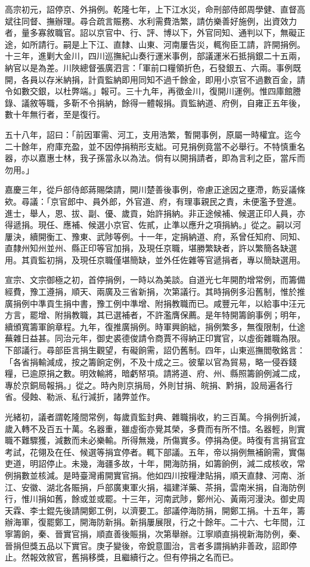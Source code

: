 \begin{pinyinscope}
高宗初元，詔停京、外捐例。乾隆七年，上下江水災，命刑部侍郎周學健、直督高斌往同督、撫辦理。尋合疏言賑務、水利需費浩繁，請仿樂善好施例，出資效力者，量多寡敘職官。詔以京官中、行、評、博以下，外官同知、通判以下，無礙正途，如所請行。嗣是上下江、直隸、山東、河南屢告災，輒徇臣工請，許開捐例。十三年，進剿大金川，四川巡撫紀山奏行運米事例，部議運米石抵捐銀二十五兩，納官以是為差。川陜總督張廣泗言：「軍前口糧領折色，石發銀五、六兩。事例既開，各員以存米納捐，計貢監納即用同知不過千餘金，即用小京官不過數百金，請令如數交銀，以杜弊端。」報可。三十九年，再徵金川，復開川運例。惟四庫館謄錄、議敘等職，多靳不令捐納，餘得一體報捐。貢監納道、府例，自雍正五年後，數十年無行者，至是復行。

五十八年，詔曰：「前因軍需、河工，支用浩繁，暫開事例，原屬一時權宜。迄今二十餘年，府庫充盈，並不因停捐稍形支絀。可見捐例竟當不必舉行。不特慎重名器，亦以嘉惠士林，我子孫當永以為法。倘有以開捐請者，即為言利之臣，當斥而勿用。」

嘉慶三年，從戶部侍郎蔣賜棨請，開川楚善後事例，帝慮正途因之壅滯，飭妥議條欸。尋議：「京官郎中、員外郎，外官道、府，有理事親民之責，未便濫予登進。進士，舉人，恩、拔、副、優、歲貢，始許捐納。非正途候補、候選正印人員，亦得遞捐。現任、應補、候選小京官、佐貳，止準以應升之項捐納。」從之。嗣以河屢決，續開衡工、豫東、武陟等例。十一年，定捐納道、府，系曾任知府、同知、直隸州知州並州、縣正印等官加捐，及現任京職，堪勝繁缺者，許以繁簡各缺選用。其貢監初捐，及現任京職僅堪簡缺，並外任佐雜等官遞捐者，專以簡缺選用。

宣宗、文宗御極之初，首停捐例，一時以為美談。自道光七年開酌增常例，而籌備經費，豫工遵捐，順天、兩廣及三省新捐，次第議行。其時捐例多沿舊制，惟於推廣捐例中準貢生捐中書，豫工例中準增、附捐教職而已。咸豐元年，以給事中汪元方言，罷增、附捐教職，其已選補者，不許濫膺保薦。是年特開籌餉事例；明年，續頒寬籌軍餉章程。九年，復推廣捐例。時軍興餉絀，捐例繁多，無復限制，仕途蕪雜日益甚。同治元年，御史裘德俊請令商賈不得納正印實官，以虛銜雜職為限。下部議行。尋部臣言捐生觀望，有礙餉需，詔仍舊制。四年，山東巡撫閻敬銘言：「各省捐輸減成，按之籌餉定例，不及十成之三。彼輩以官為貿易，略一侵吞錢糧，已逾原捐之數。明效輸將，暗虧帑項。請將道、府、州、縣照籌餉例減二成，專於京銅局報捐。」從之。時內則京捐局，外則甘捐、皖捐、黔捐，設局遍各行省。侵蝕、勒派、私行減折，諸弊並作。

光緒初，議者謂乾隆間常例，每歲貢監封典、雜職捐收，約三百萬。今捐例折減，歲入轉不及百五十萬。名器重，雖虛銜亦覺其榮，多費而有所不惜。名器輕，則實職不難驟獲，減數而未必樂輸。所得無幾，所傷實多。停捐為便。時復有言捐官宜考試，花翎及在任、候選等捐宜停者。輒下部議。五年，帝以捐例無補餉需，實傷吏道，明詔停止。未幾，海疆多故，十年，開海防捐，如籌餉例，減二成核收，常例捐數並核減。是時臺灣甫開實官捐。他如四川按糧津貼捐，順天直隸、河南、浙江、安徽、湖北各賑捐，戶部廣東軍火捐，福建洋藥、茶捐，雲南米捐，自海防例行，惟川捐如舊，餘或並或罷。十三年，河南武陟，鄭州沁、黃兩河漫決。御史周天霖、李士錕先後請開鄭工例，以濟要工。部議停海防捐，開鄭工捐。十五年，籌辦海軍，復罷鄭工，開海防新捐。新捐屢展限，行之十餘年。二十六、七年間，江寧籌餉，秦、晉實官捐，順直善後賑捐，次第舉辦。江寧順直捐視新海防例，秦、晉捐但獎五品以下實官。庚子變後，帝銳意圖治，言者多謂捐納非善政，詔即停止。然報效敘官，舊捐移獎，且繼續行之。但有停捐之名而已。


\end{pinyinscope}
